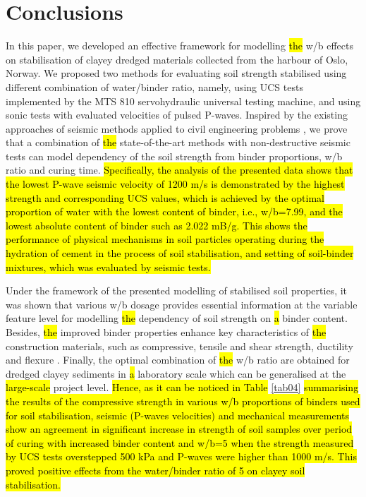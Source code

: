 \documentclass[sustainability,article,submit,pdftex,moreauthors]{Definitions/mdpi}
\begin{document}
\section{Conclusions}

In this paper, we developed an effective framework for modelling \hl{the }w/b effects on stabilisation of clayey dredged materials collected from the harbour of Oslo, Norway. We proposed two methods for evaluating soil strength stabilised using different combination of water/binder ratio, namely, using UCS tests implemented by the MTS 810 servohydraulic universal testing machine, and using sonic tests with evaluated velocities of pulsed P-waves. Inspired by the existing approaches of seismic methods applied to civil engineering problems \cite{app13042745,HARRYPERSADDANIEL2022104557}, we prove that a combination of \hl{the }state-of-the-art methods with non-destructive seismic tests can model dependency of the soil strength from binder proportions, w/b ratio and curing time. \hl{Specifically, the analysis of the presented data shows that the lowest P-wave seismic velocity of 1200 m/s is demonstrated by the highest strength and corresponding UCS values, which is achieved by the optimal proportion of water with the lowest content of binder, i.e., w/b=7.99, and the lowest absolute content of binder such as 2.022 mB/g. This shows the performance of physical mechanisms in soil particles operating during the hydration of cement in the process of soil stabilisation, and setting of soil-binder mixtures, which was evaluated by seismic tests. }

Under the framework of the presented modelling of stabilised soil properties, it was shown that various w/b dosage provides essential information at the variable feature level for modelling \hl{the }dependency of soil strength on \hl{a }binder content. Besides, \hl{the }improved binder properties enhance key characteristics of \hl{the }construction materials, such as compressive, tensile and shear strength, ductility and flexure \cite{Reddy2022,Maheretal2008,MaherHo1994}. Finally, the optimal combination of \hl{the }w/b ratio are obtained for dredged clayey sediments in \hl{a} laboratory scale which can be generalised at the \hl{large-scale }project level. \hl{Hence, as it can be noticed in Table} \ref{tab04} \hl{summarising the results of the compressive strength in various w/b proportions of binders used for soil stabilisation, seismic (P-waves velocities) and mechanical measurements show an agreement in significant increase in strength of soil samples over period of curing with increased binder content and w/b=5 when the strength measured by UCS tests overstepped 500 kPa and P-waves were higher than 1000 m/s. This proved positive effects from the water/binder ratio of 5 on clayey soil stabilisation. }
\end{document}
